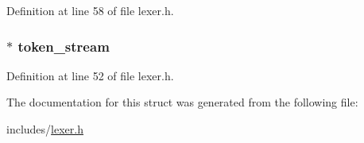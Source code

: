 Definition at line 58 of file lexer.\+h.

\hypertarget{struct_lexer_a3b32179d2f774c0424b580ead35a17f8}{
\subsubsection[{token\+\_\+stream}]{$\ast$ token\+\_\+stream}}\label{struct_lexer_a3b32179d2f774c0424b580ead35a17f8}


Definition at line 52 of file lexer.\+h.



The documentation for this struct was generated from the following file\+:\begin{DoxyCompactItemize}
\item 
includes/\hyperlink{lexer_8h}{lexer.\+h}\end{DoxyCompactItemize}
